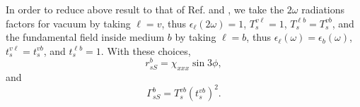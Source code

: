 In order to reduce above result to that of Ref. \cite{mizrahiJOSA88} and
\cite{sipePRB87}, we take the $2\omega$ radiations factors for vacuum by
taking $\ell=v$, thus $\epsilon_{\ell}(2\omega)=1$, $T^{v\ell}_{s}=1$,
$T^{\ell b}_{s}=T^{vb}_{s}$, and the fundamental field inside medium $b$ by
taking $\ell=b$, thus $\epsilon_{\ell}(\omega)=\epsilon_{b}(\omega)$,
$t^{v\ell}_{s}=t^{vb}_{s}$, and $t^{\ell b}_{s}=1$. With these choices,
\begin{equation*}
r^{b}_{sS} = \chi_{xxx}\sin3\phi,
\end{equation*}
and 
\begin{equation*}
\Gamma^{b}_{sS} = T^{vb}_{s}\left(t^{vb}_{s}\right)^{2}.
\end{equation*} 
